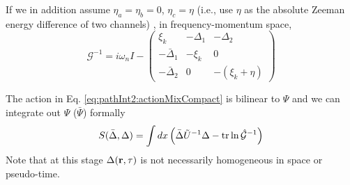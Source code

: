 
If we in addition assume $\eta_{a}=\eta_{b}=0$, $\eta_{c}=\eta$ (i.e., use $\eta$ as the absolute Zeeman energy difference of two channels)  , in frequency-momentum space, 
\begin{equation}\label{eq:pathInt2:nG}
\mathcal{G}^{-1}=i\omega_{n}I-
\begin{pmatrix}
\xi_{k}&-\Delta_{1}&-\Delta_{2}\\
-\bar{\Delta}_{1}&-\xi_{k}&0\\
-\bar{\Delta}_{2}&0&-(\xi_{k}+\eta)
\end{pmatrix}
\end{equation}



The action in Eq. \ref{eq:pathInt2:actionMixCompact} is  bilinear to $\Psi$ and we can integrate  out $\Psi$ ($\bar\Psi$) formally
\begin{equation}\label{eq:pathInt2:actionD}
S(\bar{\Delta},\Delta)=\int{dx}\left(\bar{\Delta}\tilde{U}^{-1}\Delta-\text{tr}\ln\hat{\mathcal{G}}^{-1}\right)
\end{equation}
Note that at this stage $\Delta(\mathbf{r},\tau)$  is not necessarily homogeneous in space or pseudo-time.  




